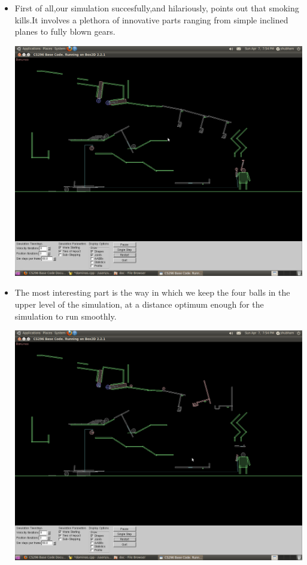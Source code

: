 \documentclass[11pt]{article}
\begin{document}
\begin{itemize}
\item First of all,our simulation succesfully,and hilariously, points out that smoking kills.It involves a plethora of innovative parts ranging from simple inclined planes to fully blown gears. 
 \begin{center}
 \includegraphics[scale=0.2]{images/I6.png}
 \end{center}
\item The most interesting part is the way in which we keep the four balls in the upper level of the simulation, at a distance optimum enough for the simulation to run smoothly.
 \begin{center}
 \includegraphics[scale=0.2]{images/I5.png}

\end{center}
\end{itemize}
\end{document}
